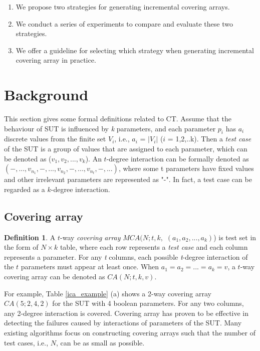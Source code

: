 \documentclass[conference]{IEEEtran}
\theoremstyle{definition}
\newtheorem{definition}{Definition}
\begin{document}
 \begin{enumerate}
 \item  We propose two strategies for generating incremental covering arrays.
 \item  We conduct a series of experiments to compare and evaluate these two strategies.
 \item  We offer a guideline for selecting which strategy when generating incremental covering array in practice.
\end{enumerate}
%

\section{Background}
This section gives some formal definitions related to CT. Assume that the behaviour of SUT is influenced by \emph{k} parameters, and each parameter $p_{i}$ has $a_{i}$ discrete values from the finite set $V_{i}$, i.e., $a_{i}$ = $|V_{i}|$ ($i$ = 1,2,..k). Then a \emph{test case} of the SUT is a group of values that are assigned to each parameter, which can be denoted as ($v_{1}, v_{2}, ..., v_{k}$). An $t$-degree interaction can be formally denoted as $(-, ..., v_{n_{1}}, -, ..., v_{n_{2}},-, ...,v_{n_{t}}, -, ...)$, where some t parameters have fixed values and other irrelevant parameters are represented as "-". In fact, a test case can be regarded as a $k$-degree interaction.


\subsection{Covering array}

\begin{definition}A $t$-way \emph{covering array} $MCA(N; t, k,$ $(a_{1}, a_{2}, ..., a_{k})$) is test set in the form of $N \times k$ table, where each row represents a \emph{test case} and each column represents a parameter.  For any \emph{t} columns, each possible \emph{t}-degree interaction of the $t$ parameters must appear at least once. When $ a_{1} = a_{2} = ... = a_{k} = v $, a $t$-way covering array can be denoted as $CA(N; t, k, v)$.
\end{definition}


For example, Table \ref{ica_example} (a) shows a 2-way covering array $CA(5;2,4,2)$ for the SUT with 4 boolean parameters. For any two columns, any 2-degree interaction is covered.  Covering array has proven to be effective in detecting the failures caused by interactions of parameters of the SUT. Many existing algorithms focus on constructing covering arrays such that the number of test cases, i.e., $N$, can be as small as possible.
\end{document}
